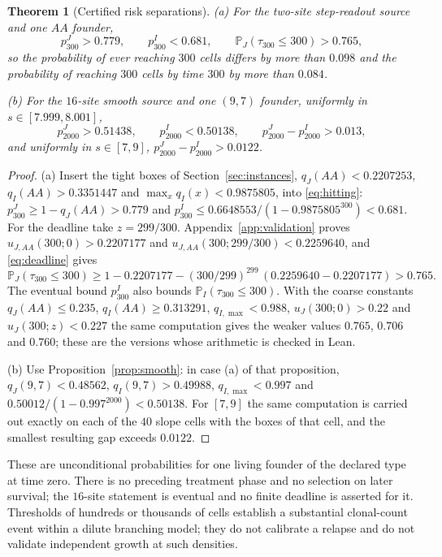 \documentclass[11pt]{article}
\newtheorem{theorem}{Theorem}
\theoremstyle{remark}
\newcommand{\PP}{\mathbb P}
\begin{document}
\begin{theorem}[Certified risk separations]\label{thm:application}
\textup{(a)} For the two-site step-readout source and one $AA$ founder,
\[
 p^J_{300}>0.779,\qquad p^I_{300}<0.681,\qquad\PP_J(\tau_{300}\le300)>0.765 ,
\]
so the probability of ever reaching $300$ cells differs by more than $0.098$
and the probability of reaching $300$ cells by time $300$ by more than
$0.084$.

\textup{(b)} For the $16$-site smooth source and one $(9,7)$ founder,
uniformly in $s\in[7.999,8.001]$,
\[
 p^J_{2000}>0.51438,\qquad p^I_{2000}<0.50138,\qquad p^J_{2000}-p^I_{2000}>0.013 ,
\]
and uniformly in $s\in[7,9]$, $p^J_{2000}-p^I_{2000}>0.0122$.
\end{theorem}
\begin{proof}
(a) Insert the tight boxes of Section~\ref{sec:instances},
$q_J(AA)<0.2207253$, $q_I(AA)>0.3351447$ and $\max_xq_I(x)<0.9875805$, into
\eqref{eq:hitting}: $p^J_{300}\ge1-q_J(AA)>0.779$ and
$p^I_{300}\le0.6648553/(1-0.9875805^{300})<0.681$. For the deadline take
$z=299/300$. Appendix~\ref{app:validation} proves
$u_{J,AA}(300;0)>0.2207177$ and $u_{J,AA}(300;299/300)<0.2259640$, and
\eqref{eq:deadline} gives
\[
 \PP_J(\tau_{300}\le300)\ge1-0.2207177-(300/299)^{299}\,(0.2259640-0.2207177)>0.765 .
\]
The eventual bound
$p^I_{300}$ also bounds $\PP_I(\tau_{300}\le300)$. With the coarse constants
$q_J(AA)\le0.235$, $q_I(AA)\ge0.313291$, $q_{I,\max}<0.988$,
$u_J(300;0)>0.22$ and $u_J(300;z)<0.227$ the same computation gives the weaker
values $0.765$, $0.706$ and $0.760$; these are the versions whose arithmetic
is checked in Lean.

(b) Use Proposition~\ref{prop:smooth}: in case (a) of that proposition,
$q_J(9,7)<0.48562$, $q_I(9,7)>0.49988$, $q_{I,\max}<0.997$ and
$0.50012/(1-0.997^{2000})<0.50138$. For $[7,9]$ the same computation is
carried out exactly on each of the $40$ slope cells with the boxes of that
cell, and the smallest resulting gap exceeds $0.0122$.
\end{proof}

These are unconditional probabilities for one living founder of the declared
type at time zero. There is no preceding treatment phase and no selection on
later survival; the $16$-site statement is eventual and no finite deadline is
asserted for it. Thresholds of hundreds or thousands of cells establish a
substantial clonal-count event within a dilute branching model; they do not
calibrate a relapse and do not validate independent growth at such
densities.
\end{document}
